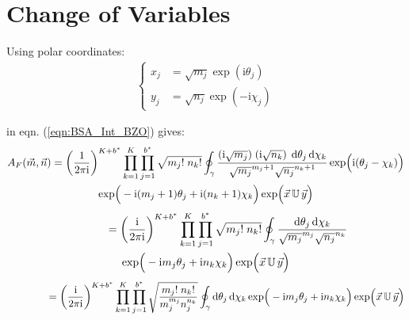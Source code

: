 \documentclass[
	english,
	a4paper,
	fontsize=10pt,
	parskip=half,
	titlepage=true,
	DIV=12,
	final
]{scrreprt}
\newcommand*{\iunit}{\ensuremath{\mathrm{i}}}
\begin{document}
\section{Change of Variables}
Using polar coordinates:
\begin{align}
	\begin{cases}
	x_j &= \sqrt{m_j} \exp( \iunit \theta_j) \\
	y_j &= \sqrt{n_j} \exp(-\iunit \chi  _j)
	\end{cases}
	\label{eqn:DefXY}
\end{align}

in eqn. (\ref{eqn:BSA_Int_BZO}) gives:
\begin{multline}
	A_F(\vec{m}, \vec{n})
=
	\qty(
		\frac{1}{2\pi\iunit}
	)^{K + b^*}
	\prod_{k=1}^{K}
	\prod_{j=1}^{b^*}
		\sqrt{m_j! \; n_k!}
		\oint_{\gamma}
			\frac
				{ (\iunit \sqrt{m_j}) \; (\iunit \sqrt{n_k}) \; \dd{\theta_j} \dd{\chi_k}}
				{\sqrt{m_j}^{m_j+1}  \sqrt{n_j}^{n_k+1}}
			\exp( \Big. \iunit(\theta_j - \chi_k))
\\
	\exp(
		\Big.
		-\iunit (m_j + 1) \theta_j
		+\iunit (n_k + 1) \chi  _k
	)
	\exp( \Big. \vec{x} \, \mathbb{U} \, \vec{y})
\end{multline}
\begin{multline}
	\qquad\qquad
=
	\qty(
		\frac{\iunit}{2\pi\iunit}
	)^{K + b^*}
	\prod_{k=1}^{K}
	\prod_{j=1}^{b^*}
		\sqrt{m_j! \; n_k!}
		\oint_{\gamma}
			\frac
				{\dd{\theta_j} \dd{\chi_k}}
				{\sqrt{m_j}^{m_j}  \sqrt{n_j}^{n_k}}
\\
	\exp(
		\Big.
		-\iunit m_j \theta_j
		+\iunit n_k \chi  _k
	)
	\exp( \Big. \vec{x} \, \mathbb{U} \, \vec{y})
\end{multline}
\begin{multline}
	\qquad\qquad
=
	\qty(
		\frac{\iunit}{2\pi\iunit}
	)^{K + b^*}
	\prod_{k=1}^{K}
	\prod_{j=1}^{b^*}
		\sqrt{\frac
			{m_j! \; n_k!}
			{m_j^{m_j}  n_j^{n_k}}
		}
		\oint_{\gamma}
			\dd{\theta_j} \dd{\chi_k}
	\exp(
		\Big.
		-\iunit m_j \theta_j
		+\iunit n_k \chi  _k
	)
	\exp( \Big. \vec{x} \, \mathbb{U} \, \vec{y})
\end{multline}
\end{document}
